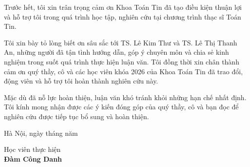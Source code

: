 Trước hết, tôi xin trân trọng cảm ơn Khoa Toán Tin đã tạo điều kiện thuận lợi và hỗ trợ tôi trong quá trình học tập, nghiên cứu tại chương trình thạc sĩ Toán Tin.
\par
Tôi xin bày tỏ lòng biết ơn sâu sắc tới TS. Lê Kim Thư và TS. Lê Thị Thanh An, những người đã tận tình hướng dẫn, góp ý chuyên môn và chia sẻ kinh nghiệm trong suốt quá trình thực hiện luận văn. Tôi đồng thời xin chân thành cảm ơn quý thầy, cô và các học viên khóa 2026 của Khoa Toán Tin đã trao đổi, động viên và hỗ trợ tôi hoàn thành nghiên cứu này.
\par
Mặc dù đã nỗ lực hoàn thiện, luận văn khó tránh khỏi những hạn chế nhất định. Tôi kính mong nhận được các ý kiến đóng góp của quý thầy, cô và bạn đọc để nghiên cứu được tiếp tục bổ sung và hoàn thiện.
\begin{flushright}
    Hà Nội, ngày tháng năm 
    \textbf{}\\[0.1 cm]
\end{flushright}
\begin{center}
   \hspace{8.8cm}  Học viên thực hiện\\[2 cm]

   \hspace{8.8cm} \bf Đàm Công Danh
\end{center}

